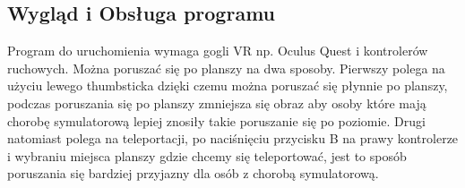 \documentclass[a4paper,12pt,reqno]{article}
\begin{document}
\subsection{Wygląd i Obsługa programu}
{\color{blue}
Program do uruchomienia wymaga gogli VR np. Oculus Quest i kontrolerów ruchowych. Można poruszać się po planszy na dwa sposoby. Pierwszy polega na użyciu lewego thumbsticka dzięki czemu można poruszać się płynnie po planszy, podczas poruszania się po planszy zmniejsza się obraz aby osoby które mają chorobę symulatorową\cite{choroba_vr} lepiej znosiły takie poruszanie się po poziomie. Drugi natomiast polega na teleportacji, po naciśnięciu przycisku B na prawy kontrolerze i wybraniu miejsca planszy gdzie chcemy się teleportować, jest to sposób poruszania się bardziej przyjazny dla osób z chorobą symulatorową.

}
\end{document}

